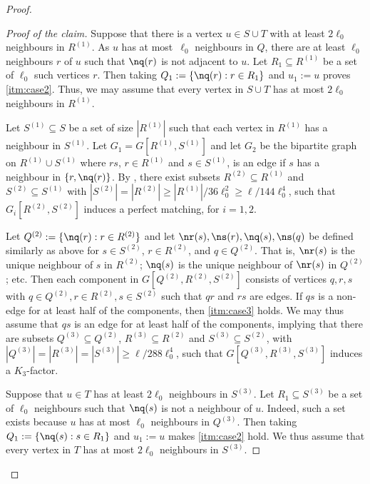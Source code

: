 \documentclass[11pt,english]{article}
\theoremstyle{plain}
\theoremstyle{definition}
\theoremstyle{remark}
\begin{document}
\begin{proof}
\begin{proof}[Proof of the claim]
            Suppose that there is a vertex $u \in S \cup T$ with at least $2\ell_0$ neighbours in $R^{(1)}$. 
            As $u$ has at most~$\ell_0$ neighbours in $Q$, there are at least $\ell_0$ neighbours $r$ of $u$ such that $\nq(r)$ is not adjacent to $u$.
            Let $R_1 \subseteq R^{(1)}$ be a set of $\ell_0$ such vertices $r$.
            Then taking $Q_1 := \{\nq(r) : r \in R_1\}$ and $u_1 := u$ proves \ref{itm:case2}.
            Thus, we may assume that every vertex in $S \cup T$ has at most $2\ell_0$ neighbours in $R^{(1)}$.
            
            Let $S^{(1)} \subseteq S$ be a set of size $|R^{(1)}|$ such that each vertex in $R^{(1)}$ has a neighbour in $S^{(1)}$. 
            Let $G_1 = G[R^{(1)}, S^{(1)}]$ and let $G_2$ be the bipartite graph on $R^{(1)}\cup S^{(1)}$ where $rs$, $r \in R^{(1)}$ and $s \in S^{(1)}$, is an edge if $s$ has a neighbour in $\{r, \nq(r)\}$. By , %
            there exist subsets $R^{(2)} \subseteq R^{(1)}$ and $S^{(2)} \subseteq S^{(1)}$ with $|S^{(2)}| = |R^{(2)}| \ge |R^{(1)}| / 36\ell_0^2 \ge \ell / 144 \ell_0^4$, such that $G_i[R^{(2)}, S^{(2)}]$ induces a perfect matching, for $i=1,2$. 
            
            Let $Q^{(2)} := \{\nq(r) : r \in R^{(2)}\}$  and let $\nr(s), \ns(r), \nq(s), \ns(q)$ be defined similarly as above for $s \in S^{(2)}$, $ r \in R^{(2)}$, and $q \in Q^{(2)}$. That is, $\nr(s)$ is the unique neighbour of $s$ in $R^{(2)}$; $\nq(s)$ is the unique neighbour of $\nr(s)$ in $Q^{(2)}$; etc. 
            Then each component in $G[Q^{(2)}, R^{(2)}, S^{(2)}]$ consists of vertices $q, r, s$ with $q \in Q^{(2)}, r \in R^{(2)}, s \in S^{(2)}$ such that $qr$ and $rs$ are edges. %
            If $qs$ is a non-edge for at least half of the components, then \ref{itm:case3} holds. We may thus assume that $qs$ is an edge for at least half of the components, implying that there are subsets $Q^{(3)} \subseteq Q^{(2)}$, $R^{(3)} \subseteq R^{(2)}$ and $S^{(3)} \subseteq S^{(2)}$, with $|Q^{(3)}| = |R^{(3)}| = |S^{(3)}| \ge \ell / 288 \ell_0^4$, such that $G[Q^{(3)}, R^{(3)}, S^{(3)}]$ induces a $K_3$-factor.
            
            Suppose that $u \in T$ has at least $2\ell_0$ neighbours in $S^{(3)}$. 
            Let $R_1\subseteq S^{(3)}$ be a set of $\ell_0$ neighbours such that $\nq(s)$ is not a neighbour of $u$. Indeed, such a set exists because $u$ has at most $\ell_0$ neighbours in $Q^{(3)}$. Then taking $Q_1 := \{\nq(s) : s \in R_1\}$ and $u_1 := u$ makes \ref{itm:case2} hold.
            We thus assume that every vertex in $T$ has at most $2\ell_0$ neighbours in $S^{(3)}$.
            

\end{proof}
\end{proof}
\end{document}
